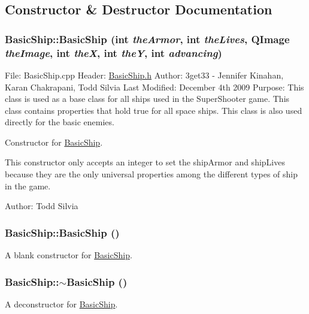 \subsection{Constructor \& Destructor Documentation}
\hypertarget{class_basic_ship_ad7432632bd796076e9f5c25b5447807a}{
\subsubsection[{BasicShip}]{\setlength{\rightskip}{0pt plus 5cm}BasicShip::BasicShip (int {\em theArmor}, \/  int {\em theLives}, \/  QImage {\em theImage}, \/  int {\em theX}, \/  int {\em theY}, \/  int {\em advancing})}}
\label{class_basic_ship_ad7432632bd796076e9f5c25b5447807a}
File: BasicShip.cpp Header: \hyperlink{_basic_ship_8h_source}{BasicShip.h} Author: 3get33 -\/ Jennifer Kinahan, Karan Chakrapani, Todd Silvia Last Modified: December 4th 2009 Purpose: This class is used as a base class for all ships used in the SuperShooter game. This class contains properties that hold true for all space ships. This class is also used directly for the basic enemies.

Constructor for \hyperlink{class_basic_ship}{BasicShip}.

This constructor only accepts an integer to set the shipArmor and shipLives because they are the only universal properties among the different types of ship in the game.

Author: Todd Silvia \hypertarget{class_basic_ship_aa7993a536c700061baa1d0846801a111}{
\subsubsection[{BasicShip}]{\setlength{\rightskip}{0pt plus 5cm}BasicShip::BasicShip ()}}
\label{class_basic_ship_aa7993a536c700061baa1d0846801a111}
A blank constructor for \hyperlink{class_basic_ship}{BasicShip}. \hypertarget{class_basic_ship_a54dac10003c33f1a21f6500ed33dcd6c}{
\subsubsection[{$\sim$BasicShip}]{\setlength{\rightskip}{0pt plus 5cm}BasicShip::$\sim$BasicShip ()}}
\label{class_basic_ship_a54dac10003c33f1a21f6500ed33dcd6c}
A deconstructor for \hyperlink{class_basic_ship}{BasicShip}. 

